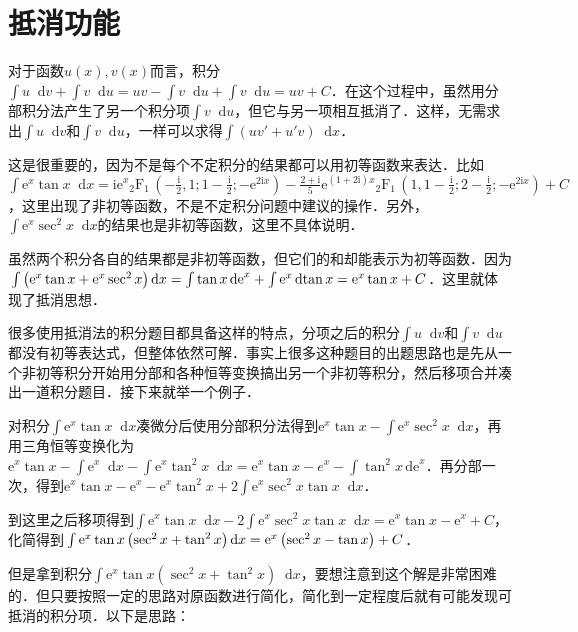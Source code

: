 \documentclass{ctexbook}
\newcommand{\e}{\mathrm{e}}
\newcommand*{\dif}{\mathop{}\!\mathrm{d}}
\begin{document}
\section{抵消功能}
对于函数$u\left(x\right),v\left(x\right)$而言，积分$\int u\dif{v}+\int v\dif{u}=uv-\int v\dif{u}+\int v\dif{u}=uv+C$．在这个过程中，虽然用分部积分法产生了另一个积分项$\int v\dif{u}$，但它与另一项相互抵消了．这样，无需求出$\int u\dif{v}$和$\int v\dif{u}$，一样可以求得$\int\left(uv'+u'v\right)\dif{x}$．\par
这是很重要的，因为不是每个不定积分的结果都可以用初等函数来表达．比如$\int\mathrm{e}^{x}\tan{x}\dif{x}=\mathrm{ie}^{x}\mathrm{_{2}F_{1}}\,{\left(-\frac{\mathrm{i}}{2},1;1-\frac{\mathrm{i}}{2};-\mathrm{e}^{2\mathrm{i}x}\right)}-\frac{2+\mathrm{i}}{5}\mathrm{e}^{\left(1+2\mathrm{i}\right)x}\mathrm{_{2}F_{1}}\,\left(1,1-\frac{\mathrm{i}}{2};2-\frac{\mathrm{i}}{2};-\mathrm{e}^{2\mathrm{i}x}\right)+C$，这里出现了非初等函数，不是不定积分问题中建议的操作．另外，$\int\mathrm{e}^{x}\sec^{2}{x}\dif{x}$的结果也是非初等函数，这里不具体说明．\par
虽然两个积分各自的结果都是非初等函数，但它们的和却能表示为初等函数．因为$\\\int\left(\mathrm{e}^{x}\tan{x}+\mathrm{e}^{x}\sec^{2}{x}\right)\dif{x}=\int\tan{x}\,\mathrm{de}^{x}+\int\mathrm{e}^{x}\dif{\tan{x}}=\mathrm{e}^{x}\tan{x}+C$．这里就体现了抵消思想．\par
很多使用抵消法的积分题目都具备这样的特点，分项之后的积分$\int u\dif{v}$和$\int v\dif{u}$都没有初等表达式，但整体依然可解．事实上很多这种题目的出题思路也是先从一个非初等积分开始用分部和各种恒等变换搞出另一个非初等积分，然后移项合并凑出一道积分题目．接下来就举一个例子．\par
对积分$\int\mathrm{e}^{x}\tan{x}\dif{x}$凑微分后使用分部积分法得到$\mathrm{e}^{x}\tan{x}-\int\mathrm{e}^{x}\sec^{2}{x}\dif{x}$，再用三角恒等变换化为$\mathrm{e}^{x}\tan{x}-\int\mathrm{e}^{x}\dif{x}-\int\mathrm{e}^{x}\tan^{2}{x}\dif{x}=\mathrm{e}^{x}\tan{x}-e^{x}-\int\tan^{2}{x}\,\mathrm{de}^{x}$．再分部一次，得到$\mathrm{e}^{x}\tan{x}-\mathrm{e}^{x}-\mathrm{e}^{x}\tan^{2}{x}+2\int\mathrm{e}^{x}\sec^{2}{x}\tan{x}\dif{x}$．\par
到这里之后移项得到$\int\mathrm{e}^{x}\tan{x}\dif{x}-2\int\mathrm{e}^{x}\sec^{2}{x}\tan{x}\dif{x}=\mathrm{e}^{x}\tan{x}-\mathrm{e}^{x}+C$，化简得到$\\\int\mathrm{e}^{x}\tan{x}\left(\sec^{2}{x}+\tan^{2}{x}\right)\dif{x}=\mathrm{e}^{x}\left(\sec^{2}{x}-\tan{x}\right)+C$．\par
但是拿到积分$\int\e^{x}\tan{x}\left(\sec^{2}{x}+\tan^{2}{x}\right)\dif{x}$，要想注意到这个解是非常困难的．但只要按照一定的思路对原函数进行简化，简化到一定程度后就有可能发现可抵消的积分项．以下是思路：\par
\end{document}

